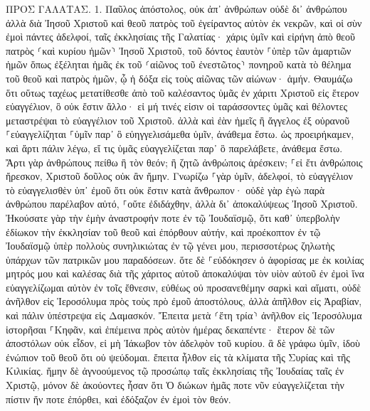 \documentclass[twoside, 9pt]{extreport}
\begin{document}
ΠΡΟΣ ΓΑΛΑΤΑΣ.
1.
Παῦλος ἀπόστολος, οὐκ ἀπ᾽ ἀνθρώπων οὐδὲ δι᾽ ἀνθρώπου ἀλλὰ διὰ Ἰησοῦ Χριστοῦ καὶ θεοῦ πατρὸς τοῦ ἐγείραντος αὐτὸν ἐκ νεκρῶν, 
καὶ οἱ σὺν ἐμοὶ πάντες ἀδελφοί, ταῖς ἐκκλησίαις τῆς Γαλατίας· 
χάρις ὑμῖν καὶ εἰρήνη ἀπὸ θεοῦ πατρὸς ⸂καὶ κυρίου ἡμῶν⸃ Ἰησοῦ Χριστοῦ, 
τοῦ δόντος ἑαυτὸν ⸀ὑπὲρ τῶν ἁμαρτιῶν ἡμῶν ὅπως ἐξέληται ἡμᾶς ἐκ τοῦ ⸂αἰῶνος τοῦ ἐνεστῶτος⸃ πονηροῦ κατὰ τὸ θέλημα τοῦ θεοῦ καὶ πατρὸς ἡμῶν, 
ᾧ ἡ δόξα εἰς τοὺς αἰῶνας τῶν αἰώνων· ἀμήν. 
Θαυμάζω ὅτι οὕτως ταχέως μετατίθεσθε ἀπὸ τοῦ καλέσαντος ὑμᾶς ἐν χάριτι Χριστοῦ εἰς ἕτερον εὐαγγέλιον, 
ὃ οὐκ ἔστιν ἄλλο· εἰ μή τινές εἰσιν οἱ ταράσσοντες ὑμᾶς καὶ θέλοντες μεταστρέψαι τὸ εὐαγγέλιον τοῦ Χριστοῦ. 
ἀλλὰ καὶ ἐὰν ἡμεῖς ἢ ἄγγελος ἐξ οὐρανοῦ ⸀εὐαγγελίζηται ⸀ὑμῖν παρ᾽ ὃ εὐηγγελισάμεθα ὑμῖν, ἀνάθεμα ἔστω. 
ὡς προειρήκαμεν, καὶ ἄρτι πάλιν λέγω, εἴ τις ὑμᾶς εὐαγγελίζεται παρ᾽ ὃ παρελάβετε, ἀνάθεμα ἔστω. 
Ἄρτι γὰρ ἀνθρώπους πείθω ἢ τὸν θεόν; ἢ ζητῶ ἀνθρώποις ἀρέσκειν; ⸀εἰ ἔτι ἀνθρώποις ἤρεσκον, Χριστοῦ δοῦλος οὐκ ἂν ἤμην. 
Γνωρίζω ⸀γὰρ ὑμῖν, ἀδελφοί, τὸ εὐαγγέλιον τὸ εὐαγγελισθὲν ὑπ᾽ ἐμοῦ ὅτι οὐκ ἔστιν κατὰ ἄνθρωπον· 
οὐδὲ γὰρ ἐγὼ παρὰ ἀνθρώπου παρέλαβον αὐτό, ⸀οὔτε ἐδιδάχθην, ἀλλὰ δι᾽ ἀποκαλύψεως Ἰησοῦ Χριστοῦ. 
Ἠκούσατε γὰρ τὴν ἐμὴν ἀναστροφήν ποτε ἐν τῷ Ἰουδαϊσμῷ, ὅτι καθ᾽ ὑπερβολὴν ἐδίωκον τὴν ἐκκλησίαν τοῦ θεοῦ καὶ ἐπόρθουν αὐτήν, 
καὶ προέκοπτον ἐν τῷ Ἰουδαϊσμῷ ὑπὲρ πολλοὺς συνηλικιώτας ἐν τῷ γένει μου, περισσοτέρως ζηλωτὴς ὑπάρχων τῶν πατρικῶν μου παραδόσεων. 
ὅτε δὲ ⸀εὐδόκησεν ὁ ἀφορίσας με ἐκ κοιλίας μητρός μου καὶ καλέσας διὰ τῆς χάριτος αὐτοῦ 
ἀποκαλύψαι τὸν υἱὸν αὐτοῦ ἐν ἐμοὶ ἵνα εὐαγγελίζωμαι αὐτὸν ἐν τοῖς ἔθνεσιν, εὐθέως οὐ προσανεθέμην σαρκὶ καὶ αἵματι, 
οὐδὲ ἀνῆλθον εἰς Ἱεροσόλυμα πρὸς τοὺς πρὸ ἐμοῦ ἀποστόλους, ἀλλὰ ἀπῆλθον εἰς Ἀραβίαν, καὶ πάλιν ὑπέστρεψα εἰς Δαμασκόν. 
Ἔπειτα μετὰ ⸂ἔτη τρία⸃ ἀνῆλθον εἰς Ἱεροσόλυμα ἱστορῆσαι ⸀Κηφᾶν, καὶ ἐπέμεινα πρὸς αὐτὸν ἡμέρας δεκαπέντε· 
ἕτερον δὲ τῶν ἀποστόλων οὐκ εἶδον, εἰ μὴ Ἰάκωβον τὸν ἀδελφὸν τοῦ κυρίου. 
ἃ δὲ γράφω ὑμῖν, ἰδοὺ ἐνώπιον τοῦ θεοῦ ὅτι οὐ ψεύδομαι. 
ἔπειτα ἦλθον εἰς τὰ κλίματα τῆς Συρίας καὶ τῆς Κιλικίας. 
ἤμην δὲ ἀγνοούμενος τῷ προσώπῳ ταῖς ἐκκλησίαις τῆς Ἰουδαίας ταῖς ἐν Χριστῷ, 
μόνον δὲ ἀκούοντες ἦσαν ὅτι Ὁ διώκων ἡμᾶς ποτε νῦν εὐαγγελίζεται τὴν πίστιν ἥν ποτε ἐπόρθει, 
καὶ ἐδόξαζον ἐν ἐμοὶ τὸν θεόν. 
\end{document}
